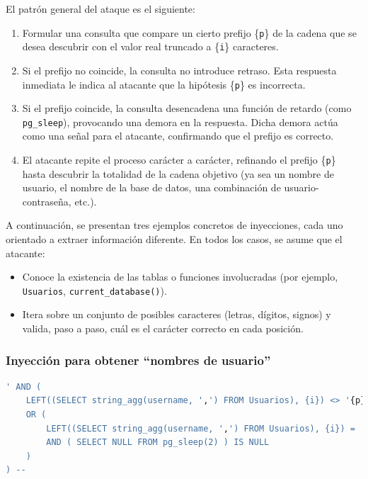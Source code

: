 \documentclass[a4paper,12pt]{article}
\begin{document}
El patrón general del ataque es el siguiente:
\begin{enumerate}
    \item Formular una consulta que compare un cierto prefijo \{\texttt{p}\} de la cadena que se desea descubrir con el valor real truncado a \{\texttt{i}\} caracteres.
    \item Si el prefijo no coincide, la consulta no introduce retraso. Esta respuesta inmediata le indica al atacante que la hipótesis \{\texttt{p}\} es incorrecta.
    \item Si el prefijo coincide, la consulta desencadena una función de retardo (como \texttt{pg\_sleep}), provocando una demora en la respuesta. Dicha demora actúa como una señal para el atacante, confirmando que el prefijo es correcto.
    \item El atacante repite el proceso carácter a carácter, refinando el prefijo \{\texttt{p}\} hasta descubrir la totalidad de la cadena objetivo (ya sea un nombre de usuario, el nombre de la base de datos, una combinación de usuario-contraseña, etc.).
\end{enumerate}

A continuación, se presentan tres ejemplos concretos de inyecciones, cada uno orientado a extraer información diferente. En todos los casos, se asume que el atacante:
\begin{itemize}
    \item Conoce la existencia de las tablas o funciones involucradas (por ejemplo, \texttt{Usuarios}, \texttt{current\_database()}).
    \item Itera sobre un conjunto de posibles caracteres (letras, dígitos, signos) y valida, paso a paso, cuál es el carácter correcto en cada posición.
\end{itemize}

\subsubsection*{Inyección para obtener ``nombres de usuario''}

\begin{lstlisting}[language=SQL]
' AND ( 
    LEFT((SELECT string_agg(username, ',') FROM Usuarios), {i}) <> '{p}' 
    OR ( 
        LEFT((SELECT string_agg(username, ',') FROM Usuarios), {i}) = '{p}' 
        AND ( SELECT NULL FROM pg_sleep(2) ) IS NULL 
    ) 
) --
\end{lstlisting}
\end{document}
